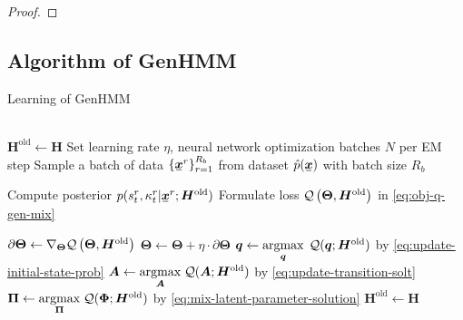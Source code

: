 \documentclass[letterpaper]{article} %
\newcommand{\ubar}[1]{\mkern2mu\underline{\mkern-2mu #1\mkern-2mu}\mkern2mu}
\newcommand{\ubm}[1]{\ubar{\bm{#1}}}
\newcommand{\ubmr}[2]{\ubar{\bm{#1}}^{#2}}
\newcommand{\smtr}[3]{{#1}^{#3}_{#2}}
\begin{document}
\begin{proof}
\end{proof}

\subsection{Algorithm of GenHMM}
\begin{algorithm}[H]
  \caption{Learning of GenHMM}\label{algo:genhmm}
  \begin{algorithmic}[1]
     \\
    \STATE $\bm{H}^{\mathrm{old}} \gets \bm{H}$
    \STATE Set learning rate $\eta$, neural network optimization batches $N$ per EM step
    \STATE Sample a batch of data $\left\{ \ubmr{x}{r} \right\}_{r=1}^{R_b}$ from dataset $\hat{p}(\ubm{x})$ with batch size $R_b$

    \STATE Compute posterior $p(\smtr{s}{t}{r}, \smtr{\kappa}{t}{r}| \ubmr{x}{r}; \bm{H}^{\mathrm{old}})$  
    \STATE Formulate loss ${\mathcal{Q}}\left({\bm{\Theta}}, {\bm{H}}^{\mathrm{old}}\right)$ in \eqref{eq:obj-q-gen-mix}

    \STATE $\partial{\bm{\Theta}} \gets  \nabla_{\bm{\Theta}} {\mathcal{Q}}\left({\bm{\Theta}},{\bm{H}}^{\mathrm{old}}\right)$
    \STATE $\bm{\Theta} \gets \bm{\Theta} + \eta \cdot \partial{\bm{\Theta}}$
    \ENDFOR
    \STATE $\bm{q} \gets \underset{\bm{q}}{\operatorname{argmax}}\;\, \mathcal{Q}(\bm{q}; \bm{H}^{\mathrm{old}})$ by \eqref{eq:update-initial-state-prob}
    \STATE $\bm{A} \gets \underset{\bm{A}}{\operatorname{argmax}}\;\mathcal{Q}(\bm{A}; \bm{H}^{\mathrm{old}})$ by \eqref{eq:update-transition-solt}
    \STATE $\bm{\Pi} \gets \underset{\bm{\Pi}}{\operatorname{argmax}}\;\mathcal{Q}(\bm{\Phi}; \bm{H}^{\mathrm{old}})$ by \eqref{eq:mix-latent-parameter-solution}
    \STATE $\bm{H}^{\mathrm{old}} \gets \bm{H}$
    \ENDFOR
  \end{algorithmic}
\end{algorithm}
\end{document}
